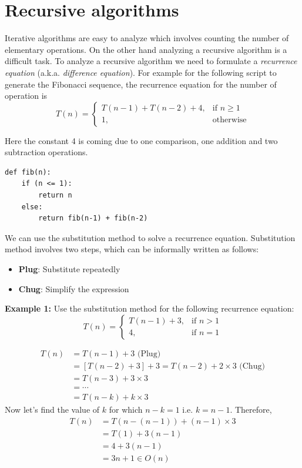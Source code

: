 \documentclass[a4paper,11pt]{book}
\begin{document}
\section{Recursive algorithms}

\noindent Iterative algorithms are easy to analyze which involves counting the number of elementary operations. On the other hand analyzing a recursive algorithm is a difficult task. To analyze a recursive algorithm we need to formulate a \textit{recurrence equation} (a.k.a. \textit{difference equation}). For example for the following script to generate the Fibonacci sequence, the recurrence equation for the number of operation is 
\[
   T(n) = 
\begin{cases}
    T(n-1) + T(n-2) + 4, & \text{if } n\geq 1\\
    1,              & \text{otherwise}
\end{cases}
\]

\noindent Here the constant 4 is coming due to one comparison, one addition and two subtraction operations.
\begin{lstlisting}
def fib(n):
    if (n <= 1):
        return n
    else:
        return fib(n-1) + fib(n-2)
\end{lstlisting}

\noindent We can use the substitution method to solve a recurrence equation. Substitution method involves two steps, which can be informally written as follows:
\begin{itemize}
    \item \textbf{Plug}: Substitute repeatedly
    \item \textbf{Chug}: Simplify the expression
\end{itemize}
\noindent \textbf{Example 1:} Use the substitution method for the following recurrence equation:
\[
   T(n) = 
\begin{cases}
    T(n-1) + 3, & \text{if }  n > 1\\
    4,          & \text{if }  n = 1
\end{cases}
\]

\begin{align*}
	T(n) &= T(n-1) + 3 \text{   (Plug)}\\
	     &= \left[T(n-2) + 3\right] + 3 = T(n-2) + 2\times 3 \text{   (Chug)}\\
	     &= T(n-3) + 3\times 3\\
	     &= \cdots\\
	     &= T(n-k) + k \times 3
\end{align*}
Now let's find the value of $k$ for which $n-k = 1$ i.e. $k=n-1$. Therefore,
\begin{align*}
	T(n) &= T(n-(n-1)) + (n-1)\times 3\\
	     &= T(1) + 3(n-1)\\
	     &= 4 + 3(n-1) \\
	     &= 3n + 1 \in O(n)
\end{align*}
\end{document}
